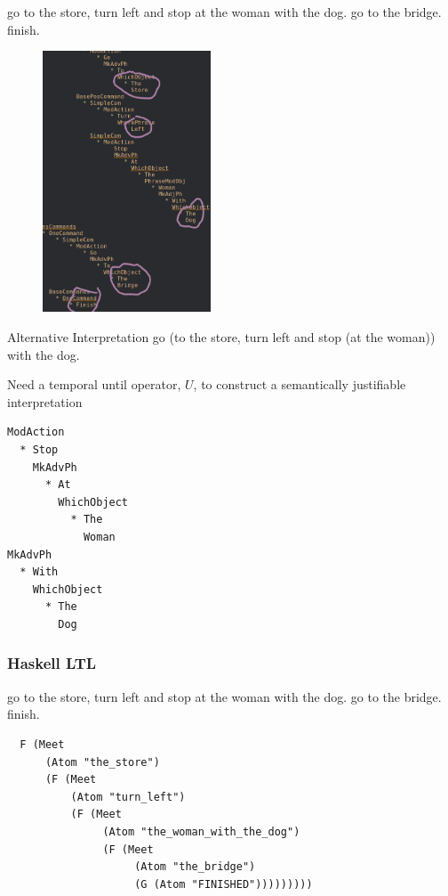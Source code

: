 \documentclass{beamer}
\begin{document}
\begin{frame}
\fontsize{9pt}{10pt}\selectfont
\begin{exampleblock}{}
go to the store, turn left and stop at the woman with the dog. go to the bridge.
finish.
\end{exampleblock}

\begin{figure}

\centering
\includegraphics[width=50mm]{pics/circledZoom.png}
\end{figure}
\end{frame}


\begin{frame}[fragile]
\begin{exampleblock}{Alternative Interpretation}
go (to the store, turn left and stop (at the woman)) with the dog. 
\end{exampleblock}
\begin{alertblock}{}
Need a temporal until operator, $U$, to construct a semantically justifiable interpretation
\end{alertblock}
\begin{verbatim}
ModAction
  * Stop
    MkAdvPh
      * At
        WhichObject
          * The
            Woman
MkAdvPh
  * With
    WhichObject
      * The
        Dog
\end{verbatim}
\end{frame}


\begin{frame}[fragile]
\frametitle{Haskell LTL}

\fontsize{9pt}{10pt}\selectfont
\begin{exampleblock}{}
go to the store, turn left and stop at the woman with the dog. go to the bridge.
finish.
\end{exampleblock}

\begin{verbatim}
  F (Meet
      (Atom "the_store")
      (F (Meet
          (Atom "turn_left")
          (F (Meet
               (Atom "the_woman_with_the_dog")
               (F (Meet
                    (Atom "the_bridge")
                    (G (Atom "FINISHED")))))))))
\end{verbatim}
\end{frame}
\end{document}
